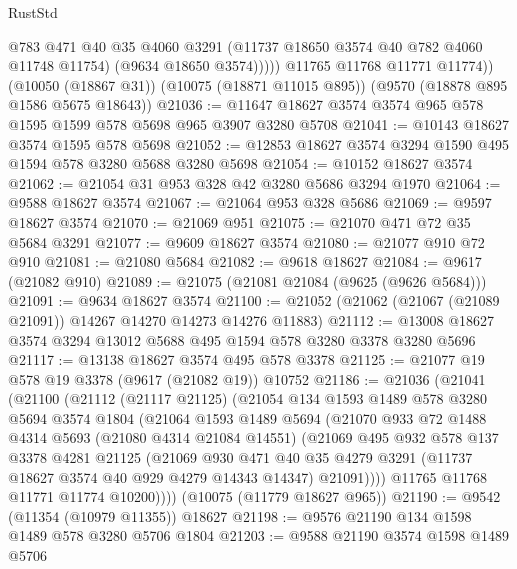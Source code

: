 \begin{lexlean}{RustStd}
\begin{coremodule}
                @783
                @471
                @40
                @35
                @4060
                @3291
                (@11737 @18650 @3574 @40 @782 @4060 @11748 @11754)
                (@9634 @18650 @3574)))))
        @11765
        @11768
        @11771
        @11774))
    (@10050 (@18867 @31))
    (@10075 (@18871 @11015 @895))
    (@9570 (@18878 @895 @1586 @5675 @18643))
@21036 := @11647 @18627 @3574 @3574 @965 @578 @1595 @1599 @578 @5698 @965 @3907 @3280 @5708
@21041 := @10143 @18627 @3574 @1595 @578 @5698
@21052 := @12853 @18627 @3574 @3294 @1590 @495 @1594 @578 @3280 @5688 @3280 @5698
@21054 := @10152 @18627 @3574
@21062 := @21054 @31 @953 @328 @42 @3280 @5686 @3294 @1970
@21064 := @9588 @18627 @3574
@21067 := @21064 @953 @328 @5686
@21069 := @9597 @18627 @3574
@21070 := @21069 @951
@21075 := @21070 @471 @72 @35 @5684 @3291
@21077 := @9609 @18627 @3574
@21080 := @21077 @910 @72 @910
@21081 := @21080 @5684
@21082 := @9618 @18627
@21084 := @9617 (@21082 @910)
@21089 := @21075 (@21081 @21084 (@9625 (@9626 @5684)))
@21091 := @9634 @18627 @3574
@21100 := @21052 (@21062 (@21067 (@21089 @21091)) @14267 @14270 @14273 @14276 @11883)
@21112 := @13008 @18627 @3574 @3294 @13012 @5688 @495 @1594 @578 @3280 @3378 @3280 @5696
@21117 := @13138 @18627 @3574 @495 @578 @3378
@21125 := @21077 @19 @578 @19 @3378 (@9617 (@21082 @19)) @10752
@21186 := @21036
    (@21041
      (@21100
        (@21112
          (@21117 @21125)
          (@21054
            @134
            @1593
            @1489
            @578
            @3280
            @5694
            @3574
            @1804
            (@21064
              @1593
              @1489
              @5694
              (@21070
                @933
                @72
                @1488
                @4314
                @5693
                (@21080 @4314 @21084 @14551)
                (@21069
                  @495
                  @932
                  @578
                  @137
                  @3378
                  @4281
                  @21125
                  (@21069
                    @930
                    @471
                    @40
                    @35
                    @4279
                    @3291
                    (@11737 @18627 @3574 @40 @929 @4279 @14343 @14347)
                    @21091))))
            @11765
            @11768
            @11771
            @11774
            @10200))))
    (@10075 (@11779 @18627 @965))
@21190 := @9542 (@11354 (@10979 @11355)) @18627
@21198 := @9576 @21190 @134 @1598 @1489 @578 @3280 @5706 @1804
@21203 := @9588 @21190 @3574 @1598 @1489 @5706

\end{coremodule}
\end{lexlean}
